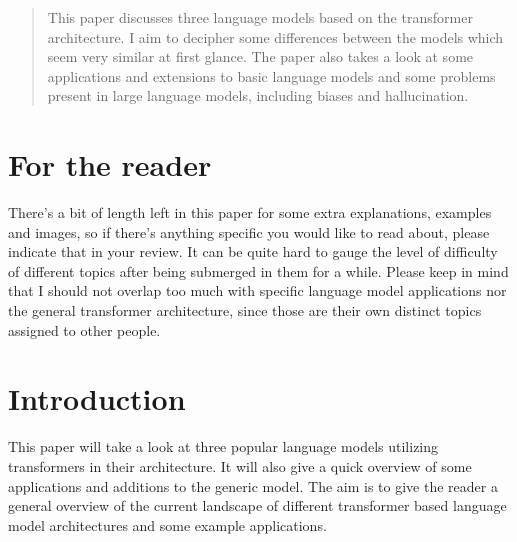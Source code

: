 \documentclass[twoside]{article}
\begin{document}
%

%


\begin{abstract}
  This paper discusses three language models based on the transformer architecture.
  I aim to decipher some differences between the models which seem very similar at first glance.
  The paper also takes a look at some applications and extensions to basic language
  models and some problems present in large language models, including biases
  and hallucination.
\end{abstract}

\section{For the reader}
There's a bit of length left in this paper for some extra explanations,
examples and images, so if there's anything specific you would like to
read about, please indicate that in your review. It can be quite hard to 
gauge the level of difficulty of different topics after being submerged 
in them for a while. Please keep in mind that I should not overlap too much
with specific language model applications nor the general transformer
architecture, since those are their own distinct topics assigned to 
other people. 

\section{Introduction}
This paper will take a look at three popular language models utilizing
transformers in their architecture. It will also give a quick overview
of some applications and additions to the generic model. The aim is to
give the reader a general overview of the current landscape of different
transformer based language model architectures and some example applications.
\end{document}
